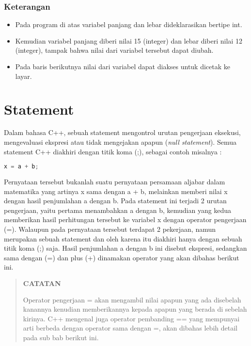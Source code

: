 \subsubsection*{Keterangan}

\begin{itemize}

\item
  Pada program di atas variabel panjang dan lebar dideklarasikan bertipe
  int.
\item
  Kemudian variabel panjang diberi nilai 15 (integer) dan lebar diberi
  nilai 12 (integer), tampak bahwa nilai dari variabel tersebut dapat
  diubah.
\item
  Pada baris berikutnya nilai dari variabel dapat diakses untuk dicetak
  ke layar.
\end{itemize}

\section{Statement}\label{statement}

Dalam bahasa C++, sebuah statement mengontrol urutan pengerjaan
eksekusi, mengevaluasi ekspresi atau tidak mengejakan apapun (\emph{null
statement}). Semua statement C++ diakhiri dengan titik koma (;), sebagai
contoh misalnya :

\begin{lstlisting}[language=c++, numbers=none]
x = a + b;
\end{lstlisting}

Pernyataan tersebut bukanlah suatu pernyataan persamaan aljabar dalam
matematika yang artinya x sama dengan a + b, melainkan memberi nilai x
dengan hasil penjumlahan a dengan b. Pada statement ini terjadi 2 urutan
pengerjaan, yaitu pertama menambahkan a dengan b, kemudian yang kedua
memberikan hasil perhitungan tersebut ke variabel x dengan operator
pengerjaan (=). Walaupun pada pernyataan tersebut terdapat 2 pekerjaan,
namun merupakan sebuah statement dan oleh karena itu diakhiri hanya
dengan sebuah titik koma (;) saja. Hasil penjumlahan a dengan b ini
disebut ekspresi, sedangkan sama dengan (=) dan plus (+) dinamakan
operator yang akan dibahas berikut ini.

\begin{quotation}
 {\LARGE {}} \textbf{CATATAN}
 
 Operator pengerjaan = akan mengambil nilai apapun yang ada disebelah
 kanannya kenudian memberikannya kepada apapun yang berada di sebelah
 kirinya. C++ mengenal juga operator pembanding == yang mempunyai
 arti berbeda dengan operator sama dengan =, akan dibahas lebih
 detail pada sub bab berikut ini.
\end{quotation}


